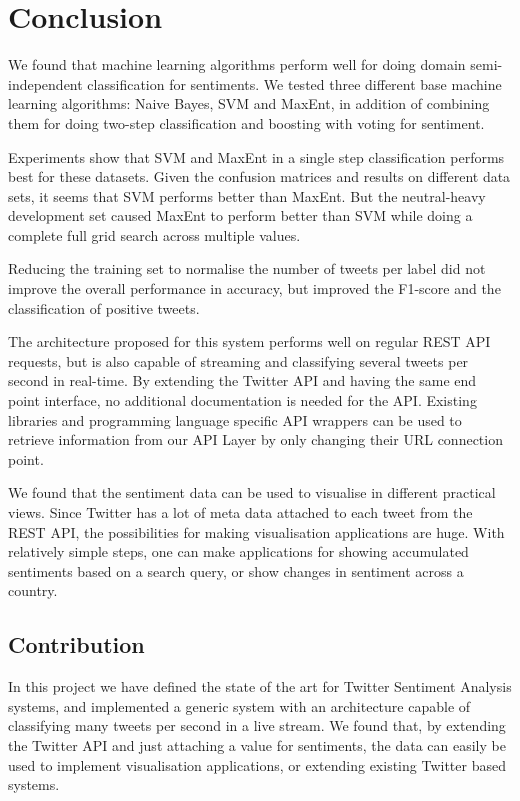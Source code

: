 \chapter{Conclusion}

We found that machine learning algorithms perform well for doing domain semi-independent classification for sentiments. We tested three different base machine learning algorithms: Naive Bayes, SVM and MaxEnt, in addition of combining them for doing two-step classification and boosting with voting for sentiment. 

Experiments show that SVM and MaxEnt in a single step classification performs best for these datasets. Given the confusion matrices and results on different data sets, it seems that SVM performs better than MaxEnt. But the neutral-heavy development set caused MaxEnt to perform better than SVM while doing a complete full grid search across multiple values.

Reducing the training set to normalise the number of tweets per label did not improve the overall performance in accuracy, but improved the F1-score and the classification of positive tweets. 

The architecture proposed for this system performs well on regular REST API requests, but is also capable of streaming and classifying several tweets per second in real-time. By extending the Twitter API and having the same end point interface, no additional documentation is needed for the API. Existing libraries and programming language specific API wrappers can be used to retrieve information from our API Layer by only changing their URL connection point. 

We found that the sentiment data can be used to visualise in different practical views. Since Twitter has a lot of meta data attached to each tweet from the REST API, the possibilities for making visualisation applications are huge. With relatively simple steps, one can make applications for showing accumulated sentiments based on a search query, or show changes in sentiment across a country. 

\section{Contribution}

In this project we have defined the state of the art for Twitter Sentiment Analysis systems, and implemented a generic system with an architecture capable of classifying many tweets per second in a live stream. We found that, by extending the Twitter API and just attaching a value for sentiments, the data can easily be used to implement visualisation applications, or extending existing Twitter based systems. 

